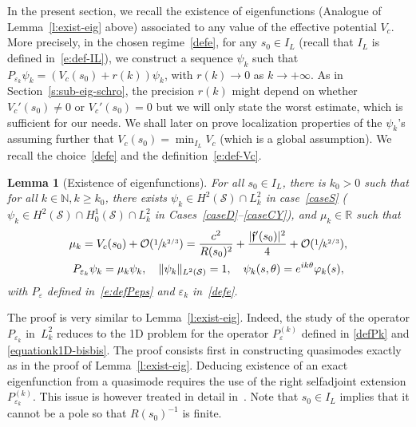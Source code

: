 \documentclass[JEP,XML,SOM,Unicode]{cedram}
\newtheorem{lemma}{Lemma}[section]
\theoremstyle{definition}
\newcommand{\calS}{\ensuremath{\mathcal S}}
\newcommand\grandon[1]{\mathcal{O}(#1)}
\newcommand{\mb}[1]{\ensuremath{\mathbb{#1}}}
\newcommand{\N}{{\mb{N}}}
\newcommand{\R}{{\mb{R}}}
\newcommand{\f}{\ensuremath{\mathfrak{f}}}
\newcommand{\ce}{c}
\let\e\varepsilon
\let\eps\varepsilon
\begin{document}
In the present section, we recall the existence of eigenfunctions (Analogue of Lemma~\ref{l:exist-eig} above) associated to any value of the effective potential $V_\ce$. More precisely, in the chosen regime~\eqref{defe}, for any $s_0\in I_L$ (recall that $I_L$ is defined in~\eqref{e:def-IL}), we construct a sequence $\psi_k$ such that $P_{\e_k} \psi_k = (V_\ce(s_0) + r(k)) \psi_k$, with $r(k)\to 0$ as $k\to + \infty$. As in Section~\ref{s:sub-eig-schro}, the precision $r(k)$ might depend on whether $V_\ce'(s_0) \neq 0$ or $V_\ce'(s_0) = 0$ but we will only state the worst estimate, which is sufficient for our needs. We shall later on prove localization properties of the $\psi_k$'s assuming further that $V_c(s_0) = \min_{I_L}V_\ce$ (which is a global assumption).
We recall the choice~\eqref{defe} and the definition~\eqref{e:def-Vc}.

\begin{lemma}[Existence of eigenfunctions]
\label{l:exist-mu-psibord}
For all $s_0 \in I_L$, there is $k_0>0$ such that for all $k\in\N, k\geq k_0$, there exists $\psi_k \in H^{2}(\calS)\cap L^2_k$ in case~\ref{caseS} (\resp $\psi_k \in H^{2}(\calS)\cap H^1_0(\calS)\cap L^2_k$ in Cases~\ref{caseD}--\ref{caseCY}), and $\mu_k \in \R$ such that
\begin{gather*}
\mu_k= V_\ce(s_0) +\grandon{\sfrac{1}{k^{2/3}}}
= \frac{\ce^2}{R(s_0)^2}+\frac{|\f'(s_0)|^2}{4} + \grandon{\sfrac{1}{k^{2/3}}}, \\
P_{\e_k} \psi_k = \mu_k \psi_k, \quad \|\psi_k\|_{L^2(\calS)}=1, \quad \psi_k(s,\theta) = e^{ik\theta} \varphi_k(s),
\end{gather*}
with $P_\eps$ defined in~\eqref{e:defPeps} and $\e_k$ in~\eqref{defe}.
\end{lemma}
The proof is very similar to Lemma~\ref{l:exist-eig}. Indeed, the study of the operator $P_{\e_k}$ in~$L^{2}_{k}$ reduces to the 1D problem for the operator $P_{\e}^{(k)}$ defined in \eqref{defPk} and \eqref{equationk1D-bisbis}. The proof consists first in constructing quasimodes exactly as in the proof of Lemma~\ref{l:exist-eig}. Deducing existence of an exact eigenfunction from a quasimode requires the use of the right selfadjoint extension $P_{\e_{k}}^{(k)}$. This issue is however treated in detail in~\cite[Lem.\,3.6]{LL:18}.
Note that $s_{0} \in I_L$ implies that it cannot be a pole so that $R(s_{0})^{-1}$ is finite.
\end{document}
